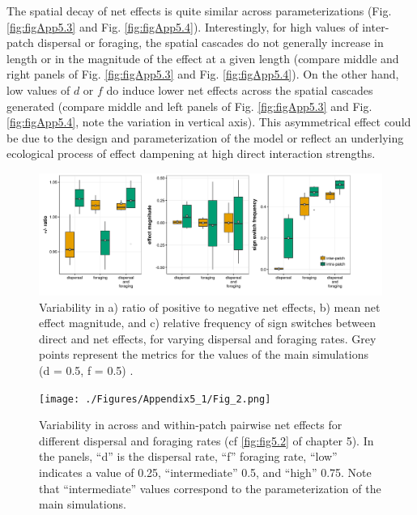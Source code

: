 The spatial decay of net effects is quite similar across parameterizations (Fig. \ref{fig:figApp5.3} and Fig. \ref{fig:figApp5.4}). Interestingly, for high values of inter-patch dispersal or foraging, the spatial cascades do not generally increase in length or in the magnitude of the effect at a given length (compare middle and right panels of Fig. \ref{fig:figApp5.3} and Fig. \ref{fig:figApp5.4}). On the other hand, low values of \(d\) or \(f\) do induce lower net effects across the spatial cascades generated (compare middle and left panels of Fig. \ref{fig:figApp5.3} and Fig. \ref{fig:figApp5.4}, note the variation in vertical axis). This asymmetrical effect could be due to the design and parameterization of the model or reflect an underlying ecological process of effect dampening at high direct interaction strengths.

\begin{figure}
\centering
\includegraphics[width=\textwidth,height=\textheight,keepaspectratio]{./Figures/Appendix5_1/Fig_1.png}
\caption[Varying +/- ratios with $d$ and $f$]{\color{Gray}Variability in a) ratio of positive to negative net effects, b) mean net effect magnitude, and c) relative frequency of sign switches between direct and net effects, for varying dispersal and foraging rates. Grey points represent the metrics for the values of the main simulations (d = 0.5, f = 0.5) . \label{fig:figApp5.1}} \end{figure}

\newpage

\begin{figure}
\centering
\texttt{[image: ./Figures/Appendix5\_1/Fig\_2.png]}
\caption[Varying net effects with $d$ and $f$]{\color{Gray}Variability in across and within-patch pairwise net effects for different dispersal and foraging rates (cf \cref{fig:fig5.2} of chapter 5). In the panels, ``d'' is the dispersal rate, ``f'' foraging rate, ``low'' indicates a value of 0.25, ``intermediate'' 0.5, and ``high'' 0.75. Note that ``intermediate'' values correspond to the parameterization of the main simulations. \label{fig:figApp5.2}}
\end{figure}

